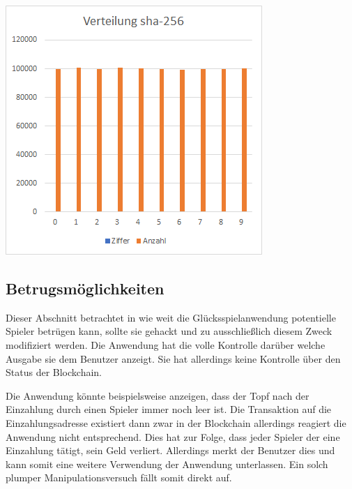 \begin{minipage}{0.5\textwidth}
\includegraphics[width=\textwidth]{Figures/verteilung_sha256}
\centering
\decoRule
{}
\label{fig:verteilung_sha256}
\end{minipage}


\subsection{Betrugsmöglichkeiten}

Dieser Abschnitt betrachtet in wie weit die Glücksspielanwendung potentielle Spieler betrügen kann, sollte sie gehackt und zu ausschließlich diesem Zweck modifiziert werden.
Die Anwendung hat die volle Kontrolle darüber welche Ausgabe sie dem Benutzer anzeigt. Sie hat allerdings keine Kontrolle über den Status der Blockchain. 

Die Anwendung könnte beispielsweise anzeigen, dass der Topf nach der Einzahlung durch einen Spieler immer noch leer ist. Die Transaktion auf die Einzahlungsadresse existiert dann zwar in der Blockchain allerdings reagiert die Anwendung nicht entsprechend. Dies hat zur Folge, dass jeder Spieler der eine Einzahlung tätigt, sein Geld verliert. Allerdings merkt der Benutzer dies und kann somit eine weitere Verwendung der Anwendung unterlassen. Ein solch plumper Manipulationsversuch fällt somit direkt auf.

